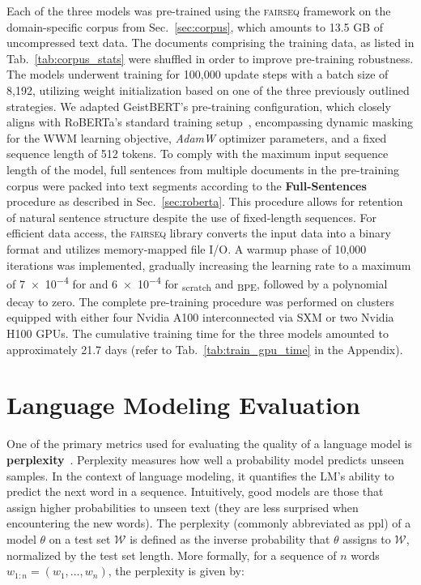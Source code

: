 Each of the three models was pre-trained using the \textsc{fairseq}
\cite{ott2019fairseq} framework on the domain-specific corpus from
Sec.~\ref{sec:corpus}, which amounts to 13.5 GB of uncompressed text data. The
documents comprising the training data, as listed in Tab.~\ref{tab:corpus_stats}
were shuffled in order to improve pre-training robustness. The models underwent
training for 100,000 update steps with a batch size of 8,192, utilizing weight
initialization based on one of the three previously outlined strategies. We
adapted GeistBERT's pre-training configuration, which closely aligns with
RoBERTa's standard training setup~\cite{liu2019roberta}, encompassing dynamic
masking for the WWM learning objective, \textit{AdamW} optimizer parameters, and
a fixed sequence length of 512 tokens. To comply with the maximum input sequence
length of the model, full sentences from multiple documents in the pre-training
corpus were packed into text segments according to the \textbf{Full-Sentences}
procedure as described in Sec.~\ref{sec:roberta}. This procedure allows for
retention of natural sentence structure despite the use of fixed-length
sequences. For efficient data access, the \textsc{fairseq} library converts the
input data into a binary format and utilizes memory-mapped file I/O. A warmup
phase of 10,000 iterations was implemented, gradually increasing the learning
rate to a maximum of \num{7e-4} for \ChristBERT{} and \num{6e-4} for
\ChristBERT\textsubscript{scratch} and \ChristBERT\textsubscript{BPE}, followed
by a polynomial decay to zero. The complete pre-training procedure was performed
on clusters equipped with either four Nvidia A100 interconnected via SXM or two
Nvidia H100 GPUs. The cumulative training time for the three models amounted to
approximately 21.7 days (refer to Tab.~\ref{tab:train_gpu_time} in the
Appendix).

\section{Language Modeling Evaluation} \label{sec:lm_eval}

One of the primary metrics used for evaluating the quality of a language model
is \textbf{perplexity}~\cite{bengio2003neural}. Perplexity measures how well a
probability model predicts unseen samples. In the context of language modeling,
it quantifies the LM's ability to predict the next word in a sequence.
Intuitively, good models are those that assign higher probabilities to unseen
text (they are less surprised when encountering the new words). The perplexity
(commonly abbreviated as ppl) of a model $\theta$ on a test set $\mathcal{W}$ is
defined as the inverse probability that $\theta$ assigns to $\mathcal{W}$,
normalized by the test set length. More formally, for a sequence of $n$ words
$w_{1:n} = (w_1, \ldots, w_n)$, the perplexity is given by:


